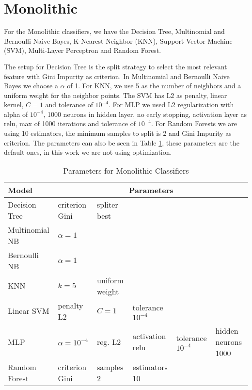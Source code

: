 \section{Monolithic}\label{mono}

For the Monolithic classifiers, we have the Decision Tree, Multinomial and Bernoulli Naive Bayes, K-Nearest Neighbor (KNN), Support Vector Machine (SVM), Multi-Layer Perceptron and Random Forest.

The setup for Decision Tree is the split strategy to select the most relevant feature with Gini Impurity as criterion. In Multinomial and Bernoulli Naive Bayes we choose a $\alpha$ of 1. For KNN, we use 5 as the number of neighbors and a uniform weight for the neighbor points. The SVM has L2 as penalty, linear kernel, $C = 1$ and tolerance of $10^{-4}$. For MLP we used L2 regularization with alpha of $10^{-4}$, 1000 neurons in hidden layer, no early stopping, activation layer as relu, max of 1000 iterations and tolerance of $10^{-4}$. For Random Forests we are using 10 estimators, the minimum samples to split is 2 and Gini Impurity as criterion. The parameters can also be seen in Table \ref{table:monolithic_params}, these parameters are the default ones, in this work we are not using optimization.

\begin{table}[h!]
    \centering
    \renewcommand{\arraystretch}{1.8}
    \begin{tabular}{ p{4cm}p{1.62cm}|p{1.5cm}|p{1.5cm}|p{1.5cm}|p{1.5cm} }
        \toprule
        Model & \multicolumn{5}{c}{Parameters} \\
        \midrule
        Decision Tree & criterion Gini & spliter best & & &\\
        Multinomial NB & $\alpha = 1$ & & & &\\
        Bernoulli NB & $\alpha = 1$ & & & &\\
        KNN & $ k = 5 $ & uniform weight & & &\\
        Linear SVM & penalty L2 & $C = 1$ & tolerance $10^{-4}$ & &\\
        MLP  & $ \alpha = 10^{-4} $ & reg. L2  & activation relu & tolerance $10^{-4}$ & hidden neurons 1000 \\
        Random Forest & criterion Gini & samples 2 & estimators 10 & & \\ [1ex]
        \bottomrule
        \end{tabular}
        \caption{%
        Parameters for Monolithic Classifiers%
        }\label{table:monolithic_params}
        \vspace{4ex}
\end{table}

